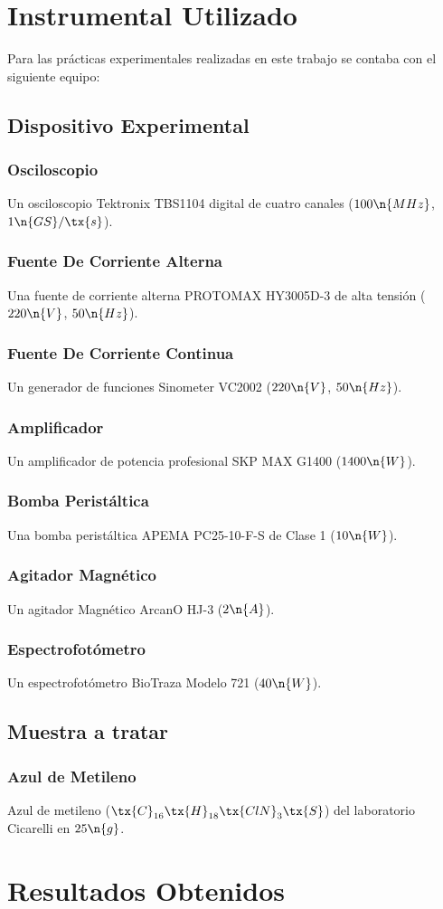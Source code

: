 



    \section{Instrumental Utilizado} \label{ap:Instrumental}
Para las prácticas experimentales realizadas en este trabajo se contaba con el siguiente equipo:
        \subsection{Dispositivo Experimental}
            \subsubsection{Osciloscopio}
Un osciloscopio Tektronix TBS1104 digital de cuatro canales ($100 \n{MHz}$, $1 \n{GS}/\tx{s}$).
            \subsubsection{Fuente De Corriente Alterna}
Una fuente de corriente alterna PROTOMAX HY3005D-3 de alta tensión ($220 \n{V}$, $50 \n{Hz}$).
            \subsubsection{Fuente De Corriente Continua}
Un generador de funciones Sinometer VC2002 ($220 \n{V}$, $50 \n{Hz}$).
            \subsubsection{Amplificador}
Un amplificador de potencia profesional SKP MAX G1400 ($1400 \n{W}$).
            \subsubsection{Bomba Peristáltica}
Una bomba peristáltica APEMA PC25-10-F-S de Clase 1 ($10 \n{W}$).
            \subsubsection{Agitador Magnético}
Un agitador Magnético ArcanO HJ-3 ($2 \n{A}$).
            \subsubsection{Espectrofotómetro}
Un espectrofotómetro BioTraza Modelo 721 ($40 \n{W}$).
        \subsection{Muestra a tratar}
            \subsubsection{Azul de Metileno}
Azul de metileno ($\tx{C}_{16}\tx{H}_{18}\tx{ClN}_3\tx{S}$) del laboratorio Cicarelli en $25 \n{g}$.
    \section{Resultados Obtenidos} \label{ap:Resultados}
